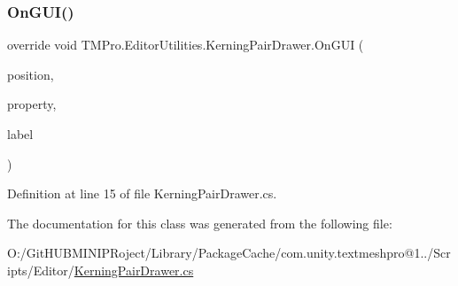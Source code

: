 \subsubsection{\texorpdfstring{OnGUI()}{OnGUI()}}
{\footnotesize\ttfamily override void T\+M\+Pro.\+Editor\+Utilities.\+Kerning\+Pair\+Drawer.\+On\+G\+UI (\begin{DoxyParamCaption}\item[{Rect}]{position,  }\item[{Serialized\+Property}]{property,  }\item[{G\+U\+I\+Content}]{label }\end{DoxyParamCaption})}



Definition at line 15 of file Kerning\+Pair\+Drawer.\+cs.



The documentation for this class was generated from the following file\+:\begin{DoxyCompactItemize}
\item 
O\+:/\+Git\+H\+U\+B\+M\+I\+N\+I\+P\+Roject/\+Library/\+Package\+Cache/com.\+unity.\+textmeshpro@1../\+Scripts/\+Editor/\mbox{\hyperlink{_kerning_pair_drawer_8cs}{Kerning\+Pair\+Drawer.\+cs}}\end{DoxyCompactItemize}
